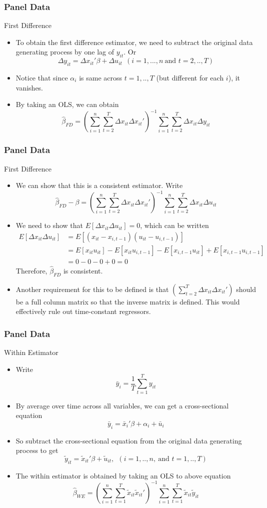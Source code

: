 \documentclass{beamer}
\begin{document}
\begin{frame}
\frametitle{Panel Data}
First Difference
\begin{itemize}
\item To obtain the first difference estimator, we need to subtract the original data generating process by one lag of $y_{it}$. Or
\[
\Delta y_{it}= \Delta x_{it}'\beta+\Delta u_{it}\ \ (i=1,...,n \ \text{and }t=2,..,T)
\]
\item  Notice that since $\alpha_i$ is same across $t=1,..,T$ (but different for each $i$), it vanishes. 
\item By taking an OLS, we can obtain
\[
\hat{\beta}_{FD}=\left(\sum_{i=1}^n\sum_{t=2}^T \Delta x_{it}\Delta x_{it}'\right)^{-1}\sum_{i=1}^n\sum_{t=2}^T \Delta x_{it}\Delta y_{it}
\]
\end{itemize}
\end{frame}


\begin{frame}
\frametitle{Panel Data}
First Difference
\begin{itemize}
\item We can show that this is a consistent estimator. Write
\[
\hat{\beta}_{FD}-\beta =\left(\sum_{i=1}^n\sum_{t=2}^T \Delta x_{it}\Delta x_{it}'\right)^{-1}\sum_{i=1}^n\sum_{t=2}^T \Delta x_{it}\Delta u_{it}
\]
\item We need to show that $E[\Delta x_{it} \Delta u_{it}]=0$, which can be written
\[
\begin{aligned}
E[\Delta x_{it} \Delta u_{it}]&=E[ (x_{it}-x_{i,t-1})( u_{it}-u_{i,t-1})]\\
&=E[ x_{it}u_{it}]-E[x_{it}u_{i,t-1}]-E[x_{i,t-1}u_{it}]+E[x_{i,t-1}u_{i,t-1}]\\
&= 0-0-0+0=0
\end{aligned}
\] 
Therefore, $\hat{\beta}_{FD}$ is consistent. 
\item Another requirement for this to be defined is that $\left(\sum_{t=2}^T \Delta x_{it}\Delta x_{it}'\right)$ should be a full column matrix so that the inverse matrix is defined. This would effectively rule out time-constant regressors. 
\end{itemize}
\end{frame}


\begin{frame}
\frametitle{Panel Data}
Within Estimator
\begin{itemize}
\item Write 
\[
\bar{y}_i =\frac{1}{T}\sum_{t=1}^T y_{it}
\]
\item By average over time across all variables, we can get a cross-sectional equation
\[
\bar{y}_i = \bar{x}_i'\beta + \alpha_i+\bar{u}_i
\]
\item  So subtract the cross-sectional equation from the original data generating process to get
\[
\tilde{y}_{it}= \tilde{x}_{it}'\beta+\tilde{u}_{it}, \ \ (i=1,..,n, \ \text{and } t=1,..,T)
\]
\item The within estimator is obtained by taking an OLS to above equation
\[
\hat{\beta}_{WE}=\left(\sum_{i=1}^n\sum_{t=1}^T \tilde{x}_{it}\tilde{x}_{it}'\right)^{-1}\sum_{i=1}^n\sum_{t=1}^T \tilde{x}_{it}\tilde{y}_{it}
\]
\end{itemize}
\end{frame}
\end{document}
